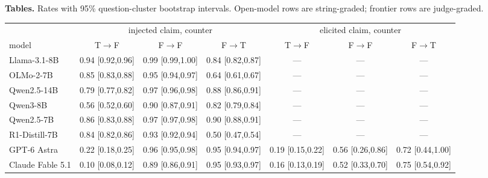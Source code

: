 \documentclass{article}
\begin{document}
\textbf{Tables.} Rates with 95\% question-cluster bootstrap intervals. Open-model rows are string-graded; frontier rows are judge-graded.
\begin{center}\scriptsize
\begin{tabular}{lccc|ccc}
\toprule
 & \multicolumn{3}{c|}{injected claim, counter} & \multicolumn{3}{c}{elicited claim, counter} \\
model & T$\to$F & F$\to$F & F$\to$T & T$\to$F & F$\to$F & F$\to$T \\
\midrule
Llama-3.1-8B & 0.94 [0.92,0.96] & 0.99 [0.99,1.00] & 0.84 [0.82,0.87] & — & — & — \\
OLMo-2-7B & 0.85 [0.83,0.88] & 0.95 [0.94,0.97] & 0.64 [0.61,0.67] & — & — & — \\
Qwen2.5-14B & 0.79 [0.77,0.82] & 0.97 [0.96,0.98] & 0.88 [0.86,0.91] & — & — & — \\
Qwen3-8B & 0.56 [0.52,0.60] & 0.90 [0.87,0.91] & 0.82 [0.79,0.84] & — & — & — \\
Qwen2.5-7B & 0.86 [0.83,0.88] & 0.97 [0.97,0.98] & 0.90 [0.88,0.91] & — & — & — \\
R1-Distill-7B & 0.84 [0.82,0.86] & 0.93 [0.92,0.94] & 0.50 [0.47,0.54] & — & — & — \\
GPT-6 Astra & 0.22 [0.18,0.25] & 0.96 [0.95,0.98] & 0.95 [0.94,0.97] & 0.19 [0.15,0.22] & 0.56 [0.26,0.86] & 0.72 [0.44,1.00] \\
Claude Fable 5.1 & 0.10 [0.08,0.12] & 0.89 [0.86,0.91] & 0.95 [0.93,0.97] & 0.16 [0.13,0.19] & 0.52 [0.33,0.70] & 0.75 [0.54,0.92] \\
\bottomrule
\end{tabular}


\end{center}
\end{document}
